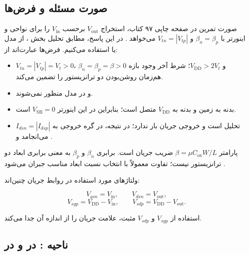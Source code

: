 \label{sec:ex16}

\subsection*{صورت مسئله و فرض‌ها}

صورت تمرین در صفحه چاپی ۹۷ کتاب، استخراج \(V_{\mathrm{out}}\) برحسب \(V_{\mathrm{in}}\) را برای نواحی  و  اینورتر  با \(\beta_n=\beta_p\) و \(V_{tn}=|V_{tp}|\) می‌خواهد \cite{weste}. در این پاسخ، مطابق تحلیل بخش ، از مدل  یا  استفاده می‌کنیم. فرض‌ها عبارت‌اند از:

\begin{itemize}
\item \(V_{tn}=|V_{tp}|=V_t>0\)، \(\beta_n=\beta_p=\beta>0\) و \(V_{\mathrm{DD}}>2V_t\)؛ شرط آخر وجود بازه هم‌زمان روشن‌بودن دو ترانزیستور را تضمین می‌کند.
\item {} و  در مدل منظور نمی‌شوند.
\item بدنه  به زمین و بدنه  به \(V_{\mathrm{DD}}\) متصل است؛ بنابراین در این اینورتر \(V_{\mathrm{SB}}=0\) است.
\item تحلیل  است و خروجی جریان بار  ندارد؛ در نتیجه،  در گره خروجی به \(I_{dsn}=|I_{dsp}|\) می‌انجامد \cite[بخش ]{weste} و \cite[اسلاید ۳]{dcslides}.
\end{itemize}

پارامتر \(\beta=\mu C_{\mathrm{ox}}W/L\) ضریب جریان است. برابری \(\beta_n\) و \(\beta_p\) به معنی برابری ابعاد دو ترانزیستور نیست؛ تفاوت  معمولاً با انتخاب نسبت ابعاد مناسب جبران می‌شود \cite[صفحه چاپی ۸۸]{weste}.

ولتاژهای مورد استفاده در روابط جریان چنین‌اند:

\nopagebreak[3]
\begin{equation}\label{eq:ex16-1}
V_{gsn}=V_{\mathrm{in}},\qquad V_{dsn}=V_{\mathrm{out}},
\end{equation}
\nopagebreak[3]
\begin{equation}\label{eq:ex16-2}
V_{sgp}=V_{\mathrm{DD}}-V_{\mathrm{in}},\qquad
V_{sdp}=V_{\mathrm{DD}}-V_{\mathrm{out}}.
\end{equation}

استفاده از \(V_{sgp}\) و \(V_{sdp}\) مثبت، علامت جریان  را از اندازه آن جدا می‌کند.

\subsection*{ناحیه :  در  و  در }

